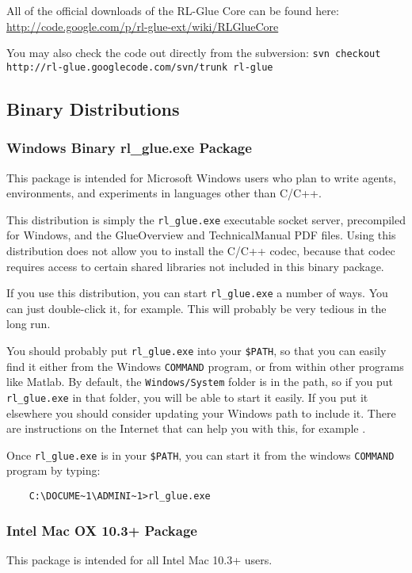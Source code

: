 \documentclass[11pt]{article}
\begin{document}
All of the official downloads of the RL-Glue Core can be found here:\newline
\url{http://code.google.com/p/rl-glue-ext/wiki/RLGlueCore}

You may also check the code out directly from the subversion:
\texttt{svn checkout http://rl-glue.googlecode.com/svn/trunk rl-glue}

\subsection{Binary Distributions}
\subsubsection{Windows Binary rl\_glue.exe Package}
This package is intended for Microsoft Windows users who plan to write agents, environments, and experiments in languages other than C/C++.

This distribution is simply the \texttt{rl\_glue.exe} executable socket server, precompiled for Windows, and the GlueOverview and TechnicalManual PDF files.  Using this distribution does not allow you to install the C/C++ codec, because that codec requires access to certain shared libraries not included in this binary package.

If you use this distribution, you can start \texttt{rl\_glue.exe} a number of ways.  You can just double-click it, for example.  This will probably be very tedious in the long run. 

You should probably put \texttt{rl\_glue.exe} into your \texttt{\$PATH}, so that you can easily find it either from the Windows \texttt{COMMAND} program, or from within other programs like Matlab.  By default, the \texttt{Windows/System} folder is in the path, so if you put \texttt{rl\_glue.exe} in that folder, you will be able to start it easily.  If you put it elsewhere you should consider updating your Windows path to include it.   There are instructions on the Internet that can help you with this, for example .

Once \texttt{rl\_glue.exe} is in your \texttt{\$PATH}, you can start it from the windows \texttt{COMMAND} program by typing:
\begin{verbatim}
	C:\DOCUME~1\ADMINI~1>rl_glue.exe
\end{verbatim}

\subsubsection{Intel Mac OX 10.3+ Package}
This package is intended for all Intel Mac 10.3+ users.
\end{document}
